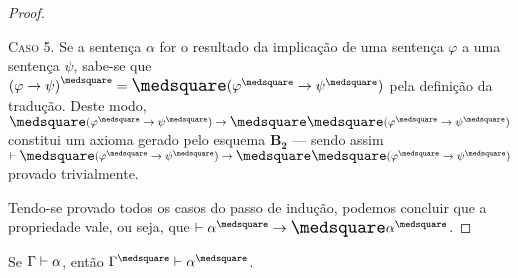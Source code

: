 \begin{lemma}
\begin{proof}
            \begin{case}
                \textsc{Caso 5.}
                Se a sentença $\alpha$ for o resultado da implicação de uma sentença $\varphi$ a uma sentença $\psi$, sabe-se que ${(\varphi\to\psi)}^\medsquare=\nec(\varphi^\medsquare\to\psi^\medsquare)$ pela definição da tradução.
                Deste modo, $\nec(\varphi^\medsquare\to\psi^\medsquare)\to\nec\nec(\varphi^\medsquare\to\psi^\medsquare)$ constitui um axioma gerado pelo esquema \hyperref[MB2]{$\mathbf{B_2}$} --- sendo assim $\entails\nec(\varphi^\medsquare\to\psi^\medsquare)\to\nec\nec(\varphi^\medsquare\to\psi^\medsquare)$ provado trivialmente.
            \end{case}
            \vspace{.5\baselineskip}
            Tendo-se provado todos os casos do passo de indução, podemos concluir que a propriedade vale, ou seja, que $\entails\alpha^\medsquare\to\nec\alpha^\medsquare$.
        \end{proof}
    \end{lemma}


    \begin{theorem}\label{square-correctness}
        Se $\Gamma\mathrel{\vdash}\alpha$, então $\Gamma^\medsquare\entails\alpha^\medsquare$.
    \end{theorem}

